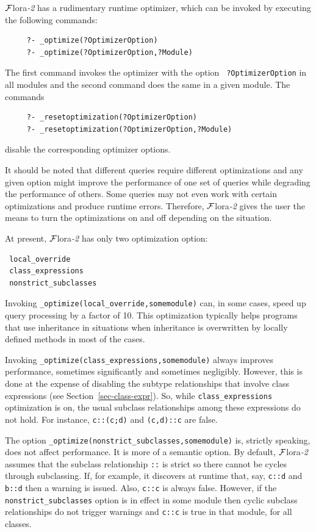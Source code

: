 \documentclass[11pt]{article}
\newcommand{\FLORA}{{\mbox{\sc ${\cal F}${lora}\rm\emph{-2}}}\xspace}
\begin{document}
\FLORA has a rudimentary runtime optimizer, which can be invoked by
executing the following commands:
\begin{verbatim}
     ?- _optimize(?OptimizerOption)  
     ?- _optimize(?OptimizerOption,?Module)  
\end{verbatim}
The first command invokes the optimizer with the option {\tt
  ?OptimizerOption} in all modules and the second command does the same in a
given module. The commands
\begin{verbatim}
     ?- _resetoptimization(?OptimizerOption)  
     ?- _resetoptimization(?OptimizerOption,?Module)    
\end{verbatim}
disable the corresponding optimizer options.

It should be noted that different queries require different optimizations
and any given option might improve the performance of one set of queries
while degrading the performance of others.
Some queries may not even work with certain optimizations and produce
runtime errors.
Therefore, \FLORA gives the user
the means to turn the optimizations on and off depending on the situation.

At present, \FLORA has only two optimization option:
\begin{verbatim}
 local_override  
 class_expressions
 nonstrict_subclasses
\end{verbatim}
Invoking {\tt \_optimize(local\_override,somemodule)} can, in some cases,
speed up query processing by a factor of 10. This optimization typically
helps programs that use inheritance in situations
when inheritance is overwritten by
locally defined methods in most of the cases.

Invoking {\tt \_optimize(class\_expressions,somemodule)} always improves
performance, sometimes significantly and sometimes negligibly.
However, this is done at the expense of disabling the subtype relationships
that involve class expressions (see Section~\ref{sec-class-expr}).
So, while {\tt class\_expressions} optimization is on, the usual
subclass relationships among these expressions do not hold. For instance,
{\tt c::(c;d)} and {\tt (c,d)::c} are false.

The option {\tt \_optimize(nonstrict\_subclasses,somemodule)} is, strictly
speaking, does not affect performance. It is more of a semantic option.
By default, \FLORA assumes that the subclass relationship \texttt{::}  is strict
so there cannot be cycles through subclassing. If, for example, it
discovers at runtime that, say, \texttt{c::d} and \texttt{b::d} then a
warning is issued. Also, \texttt{c::c} is always false. However, if the
\texttt{nonstrict\_subclasses} option is in effect in some module then
cyclic subclass relationships do not trigger warnings and \texttt{c::c} is
true in that module, for all classes. 
\end{document}
